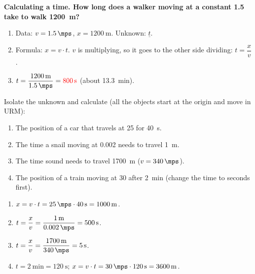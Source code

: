\begin{example}
    \textbf{Calculating a time. How long does a walker moving at a constant \qty{1.5}{\mps} take to walk \qty{1200}{\m}?}
    \begin{enumerate}[label=\numberballmDarkTeal]
        \item Data: \(v = \qty{1.5}{\mps}\), \(x = \qty{1200}{\m}\). Unknown: \(\underline{t}\).
        \item Formula: \(x = v \cdot t\). \(v\) is multiplying, so it goes to the other side dividing: \(t = \dfrac{x}{v}\).
        \item \(t = \dfrac{\qty{1200}{\m}}{\qty{1.5}{\mps}} = \textcolor{red}{\qty{800}{\s}}\) (about \qty{13.3}{\minute}).
    \end{enumerate}
\end{example}

\begin{exercise}
    Isolate the unknown and calculate (all the objects start at the origin and move in URM):
    \begin{enumerate}[label=\letraminuscula]
        \item The position of a car that travels at \qty{25}{\mps} for \qty{40}{\s}.
        \item The time a snail moving at \qty{0.002}{\mps} needs to travel \qty{1}{\m}.
        \item The time sound needs to travel \qty{1700}{\m} (\(v = \qty{340}{\mps}\)).
        \item The position of a train moving at \qty{30}{\mps} after \qty{2}{\minute} (change the time to seconds first).
    \end{enumerate}
    \begin{solu}
        \begin{enumerate}[label=\alph*)]
            \item \(x = v \cdot t = \qty{25}{\mps} \cdot \qty{40}{\s} = \qty{1000}{\m}\).
            \item \(t = \dfrac{x}{v} = \dfrac{\qty{1}{\m}}{\qty{0.002}{\mps}} = \qty{500}{\s}\).
            \item \(t = \dfrac{x}{v} = \dfrac{\qty{1700}{\m}}{\qty{340}{\mps}} = \qty{5}{\s}\).
            \item \(t = \qty{2}{\minute} = \qty{120}{\s}\); \(x = v \cdot t = \qty{30}{\mps} \cdot \qty{120}{\s} = \qty{3600}{\m}\).
        \end{enumerate}
    \end{solu}
\end{exercise}

